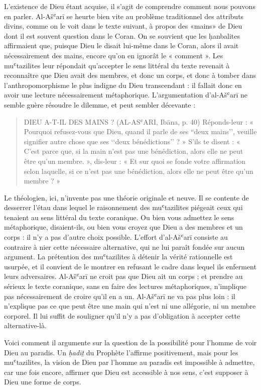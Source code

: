 L'existence de Dieu étant acquise, il s'agit de comprendre comment nous
pouvons en parler. Al-Ašʿarī se heurte bien vite au problème
traditionnel des attributs divins, comme on le voit dans le texte
suivant, à propos des «mains» de Dieu dont il est souvent question
dans le Coran. On se souvient que les ḥanbalites affirmaient que,
puisque Dieu le disait lui-même dans le Coran, alors il avait
nécessairement des mains, encore qu'on en ignorât le
« comment ». Les muʿtazilites leur répondait qu'accepter le sens
littéral du texte revenait à reconnaître que Dieu avait des membres, et
donc un corps, et donc à tomber dans l'anthropomorphisme le plus indigne
du Dieu transcendant : il fallait donc en avoir une
lecture nécessairement métaphorique. L'argumentation d'al-Ašʿarī ne
semble guère résoudre
le dilemme, et peut sembler décevante :
\begin{quote}
    DIEU A-T-IL DES MAINS ? (AL-ASʿARI, Ibāna, p. 40)
Réponds-leur : « Pourquoi refusez-vous que Dieu, quand il parle de ses “deux mains’’, veuille signifier autre chose que ses ‘‘deux bénédictions’’ ? » S’ils te disent : « C’est parce que, si la main n’est pas une bénédiction, alors elle ne peut être qu’un membre. », dis-leur : « Et sur quoi se fonde votre affirmation selon laquelle, si ce n’est pas une bénédiction, alors elle ne peut être qu’un membre ? »

\end{quote}
Le théologien, ici, n'invente pas une théorie originale et neuve. Il se
contente de desserrer l'étau dans lequel le raisonnement des
muʿtazilites piégeait ceux qui tenaient au sens littéral du texte
coranique. Ou bien vous admettez le sens métaphorique, disaient-ils, ou
bien vous croyez que Dieu a des membres et un corps : il n'y a pas
d'autre choix possible. L'effort d'al-Ašʿarī consiste au contraire à
nier cette nécessaire alternative, qui ne lui paraît fondée sur aucun
argument. La prétention des muʿtazilites à détenir la vérité rationnelle
est usurpée, et il convient de le montrer en refusant le cadre dans
lequel ils enferment leurs adversaires. Al-Ašʿarī ne croit pas que Dieu
ait un corps ; et prendre au sérieux le texte coranique, sans en faire
des lectures métaphoriques, n'implique pas nécessairement de croire
qu'il en a un. Al-Ašʿarī ne va pas plus loin : il n'explique pas ce que
peut être une main qui n'est ni une allégorie, ni un membre corporel. Il
lui suffit de souligner qu'il n'y a pas d'obligation à accepter cette
alternative-là.

Voici comment il argumente sur la question de la possibilité pour
l'homme de voir Dieu au paradis. Un \emph{ḥadīṯ} du Prophète l'affirme
positivement, mais pour les muʿtazilites, la vision de Dieu par l'homme
au paradis est impossible à admettre, car une fois encore, affirmer que
Dieu est accessible à nos sens, c'est supposer à Dieu une forme de
corps.

